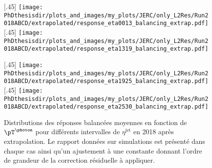 \begin{figure}[p]
\centering
{}[.45\textwidth]
{\texttt{[image: \\PhDthesisdir/plots\_and\_images/my\_plots/JERC/only\_L2Res/Run2018ABCD/extrapolated/response\_eta0013\_balancing\_extrap.pdf]}}
\hfill
{}[.45\textwidth]
{\texttt{[image: \\PhDthesisdir/plots\_and\_images/my\_plots/JERC/only\_L2Res/Run2018ABCD/extrapolated/response\_eta1319\_balancing\_extrap.pdf]}}

\vfill

[.45\textwidth]
{\texttt{[image: \\PhDthesisdir/plots\_and\_images/my\_plots/JERC/only\_L2Res/Run2018ABCD/extrapolated/response\_eta1925\_balancing\_extrap.pdf]}}
\hfill
{}[.45\textwidth]
{\texttt{[image: \\PhDthesisdir/plots\_and\_images/my\_plots/JERC/only\_L2Res/Run2018ABCD/extrapolated/response\_eta2530\_balancing\_extrap.pdf]}}

\caption[Réponses balancées en 2018 apr\`es extrapolation.]{Distributions des réponses balancées moyennes en fonction de $\pT^{\text{\photon}}$ pour différents intervalles de $\eta^\text{jet}$ en 2018 apr\`es extrapolation. Le rapport données sur simulations est présenté dans chaque cas ainsi qu'un ajustement à une constante donnant l'ordre de grandeur de la correction résiduelle à appliquer.}
\label{fig-responses_balancing_extrapolated_2018ABCD}
\end{figure}